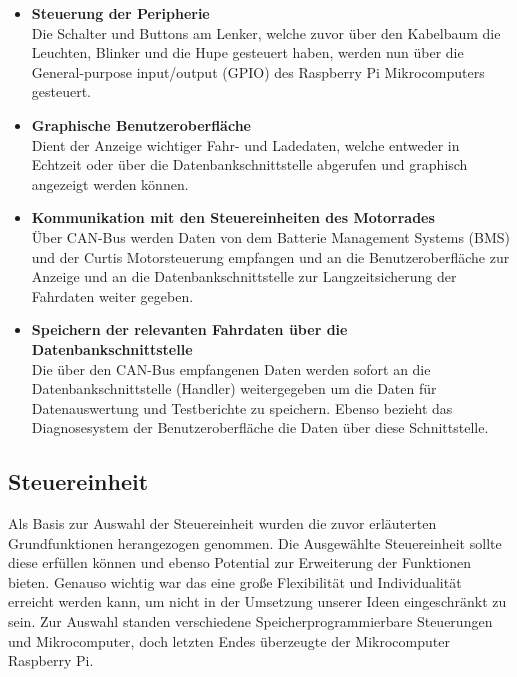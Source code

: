 \begin{itemize}

	\item \textbf{Steuerung der Peripherie} \medskip\\
	Die Schalter und Buttons am Lenker, welche zuvor über den Kabelbaum die Leuchten, Blinker und die Hupe gesteuert haben, werden nun über die General-purpose input/output (GPIO) des Raspberry Pi Mikrocomputers gesteuert.

	\item \textbf{Graphische Benutzeroberfläche}\medskip\\
Dient der Anzeige wichtiger Fahr- und Ladedaten, welche entweder in Echtzeit oder über die Datenbankschnittstelle abgerufen und graphisch angezeigt werden können.

	\item \textbf{Kommunikation mit den Steuereinheiten des Motorrades} \medskip\\
	Über CAN-Bus werden Daten von dem Batterie Management Systems (BMS) und der Curtis Motorsteuerung empfangen und an die Benutzeroberfläche zur Anzeige und an die Datenbankschnittstelle zur Langzeitsicherung der Fahrdaten weiter gegeben.

	\item \textbf{Speichern der relevanten Fahrdaten über die Datenbankschnittstelle} \medskip\\
Die über den CAN-Bus empfangenen Daten werden sofort an die Datenbankschnittstelle (Handler) weitergegeben um die Daten für Datenauswertung und Testberichte zu speichern. Ebenso bezieht das Diagnosesystem der Benutzeroberfläche die Daten über diese Schnittstelle.

\end{itemize}

\newpage

\subsection{Steuereinheit}

Als Basis zur Auswahl der Steuereinheit wurden die zuvor erläuterten Grundfunktionen herangezogen genommen. Die Ausgewählte Steuereinheit sollte diese erfüllen können und ebenso Potential zur Erweiterung der Funktionen bieten. Genauso wichtig war das eine große Flexibilität und Individualität erreicht werden kann, um nicht in der Umsetzung unserer Ideen eingeschränkt zu sein. Zur Auswahl standen verschiedene Speicherprogrammierbare Steuerungen und Mikrocomputer, doch letzten Endes überzeugte der Mikrocomputer Raspberry Pi.


